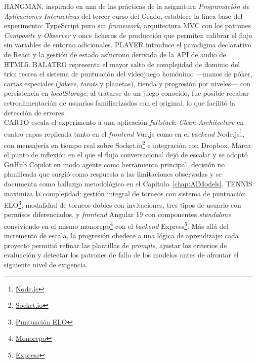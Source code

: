 \ac{HANGMAN}, inspirado en una de las prácticas de la asignatura \textit{Programación de Aplicaciones Interactivas} del tercer curso del Grado, establece la línea base del experimento: TypeScript puro sin \textit{framework}, arquitectura \ac{MVC} con los patrones \textit{Composite} y \textit{Observer} \cite{Gamma:1994:Design} y once ficheros de producción que permiten calibrar el flujo sin variables de entorno adicionales. \ac{PLAYER} introduce el paradigma declarativo de React y la gestión de estado asíncrono derivada de la \ac{API} de audio de HTML5. \ac{BALATRO} representa el mayor salto de complejidad de dominio del trío: recrea el sistema de puntuación del videojuego homónimo ---manos de póker, cartas especiales (\textit{jokers}, \textit{tarots} y planetas), tienda y progresión por niveles--- con persistencia en \textit{localStorage}; al tratarse de un juego conocido, fue posible recabar retroalimentación de usuarios familiarizados con el original, lo que facilitó la detección de errores.\\

\ac{CARTO} escala el experimento a una aplicación \textit{fullstack}: \textit{Clean Architecture} \cite{Martin:2018:CleanArchitecture} en cuatro capas replicada tanto en el \textit{frontend} Vue.js como en el \textit{backend} Node.js\footnote{\href{https://nodejs.org/es}{Node.js}}, con mensajería en tiempo real sobre Socket.io\footnote{\href{https://socket.io}{Socket.io}} e integración con Dropbox. Marca el punto de inflexión en el que el flujo conversacional dejó de escalar y se adoptó GitHub Copilot en modo agente como herramienta principal, decisión no planificada que surgió como respuesta a las limitaciones observadas y se documenta como hallazgo metodológico en el Capítulo~\ref{chap:AIModels}. \ac{TENNIS} maximiza la complejidad: gestión integral de torneos con sistema de puntuación ELO\footnote{\href{https://es.wikipedia.org/wiki/Sistema_de_puntuacion_Elo}{Puntuación ELO}}, modalidad de torneos dobles con invitaciones, tres tipos de usuario con permisos diferenciados, y \textit{frontend} Angular 19 con componentes \textit{standalone} conviviendo en el mismo monorepo\footnote{\href{https://en.wikipedia.org/wiki/Monorepo}{Monorepo}} con el \textit{backend} Express\footnote{\href{https://expressjs.com}{Express}}. Más allá del incremento de escala, la progresión obedece a una lógica de aprendizaje: cada proyecto permitió refinar las plantillas de \textit{prompts}, ajustar los criterios de evaluación y detectar los patrones de fallo de los modelos antes de afrontar el siguiente nivel de exigencia.

